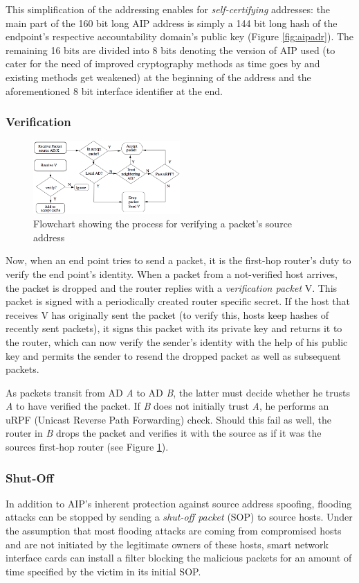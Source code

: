 \documentclass{acm_proc_article-sp}
\begin{document}
This simplification of the addressing enables for \emph{self-certifying} addresses: the main part of the 160 bit long AIP address is simply a 144 bit long hash of the endpoint's respective accountability domain's public key (Figure \ref{fig:aipadr}). The remaining 16 bits are divided into 8 bits denoting the version of AIP used (to cater for the need of improved cryptography methods as time goes by and existing methods get weakened) at the beginning of the address and the aforementioned 8 bit interface identifier at the end.

\subsubsection{Verification}
\begin{figure}[t]
  \includegraphics[width=0.5\textwidth]{images/aipflow.PNG}
  \caption{Flowchart showing the process for verifying a packet's source address \cite{aip}}
  \label{fig:aipflow}
\end{figure}
Now, when an end point tries to send a packet, it is the first-hop router's duty to verify the end point's identity. When a packet from a not-verified host arrives, the packet is dropped and the router replies with a \emph{verification packet} V. This packet is signed with a periodically created router specific secret. If the host that receives V has originally sent the packet (to verify this, hosts keep hashes of recently sent packets), it signs this packet with its private key and returns it to the router, which can now verify the sender's identity with the help of his public key and permits the sender to resend the dropped packet as well as subsequent packets.

As packets transit from AD \emph{A} to AD \emph{B}, the latter must decide whether he trusts \emph{A} to have verified the packet. If \emph{B} does not initially trust \emph{A}, he performs an uRPF (Unicast Reverse Path Forwarding) check. Should this fail as well, the router in \emph{B} drops the packet and verifies it with the source as if it was the sources first-hop router (see Figure \ref{fig:aipflow}).

\subsubsection{Shut-Off}
In addition to AIP's inherent protection against source address spoofing, flooding attacks can be stopped by sending a \emph{shut-off packet} (SOP) to source hosts. Under the assumption that most flooding attacks are coming from compromised hosts and are not initiated by the legitimate owners of these hosts, smart network interface cards can install a filter blocking the malicious packets for an amount of time specified by the victim in its initial SOP.
\end{document}
